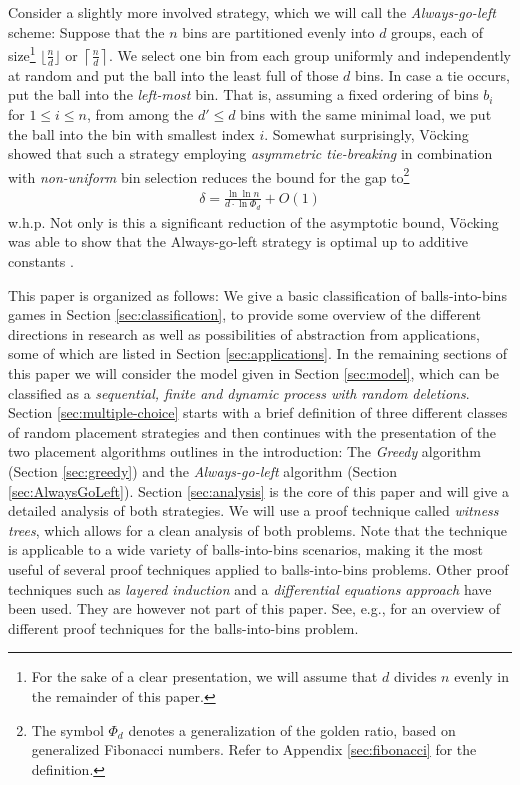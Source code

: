 \documentclass[a4paper,12pt]{article}
\begin{document}
Consider a slightly more involved strategy, which we will call the \emph{Always-go-left} scheme: Suppose that the $n$ bins are partitioned evenly into $d$ groups, each of size\footnote{For the sake of a clear presentation, we will assume that $d$ divides $n$ evenly in the remainder of this paper.} $\lfloor \frac{n}{d}\rfloor$ or $\left\lceil\frac{n}{d}\right\rceil$. We select one bin from each group uniformly and independently at random and put the ball into the least full of those $d$ bins. In case a tie occurs, put the ball into the \emph{left-most} bin. That is, assuming a fixed ordering of bins $b_i$ for $1 \leq i \leq n$, from among the $d' \leq d$ bins with the same minimal load, we put the ball into the bin with smallest index $i$. Somewhat surprisingly, V\"ocking \cite{VOC03} showed that such a strategy employing \emph{asymmetric tie-breaking} in combination with \emph{non-uniform} bin selection reduces the bound for the gap to\footnote{The symbol $\Phi_d$ denotes a generalization of the golden ratio, based on generalized Fibonacci numbers. Refer to Appendix \ref{sec:fibonacci} for the definition.}
\begin{align*}
\delta = \frac{\ln\ln n}{d \cdot \ln \Phi_d} + O(1)
\end{align*}
w.h.p. Not only is this a significant reduction of the asymptotic bound, V\"ocking was able to show that the Always-go-left strategy is optimal up to additive constants \cite{VOC03}.

This paper is organized as follows: We give a basic classification of balls-into-bins games in Section \ref{sec:classification}, to provide some overview of the different directions in research as well as possibilities of abstraction from applications, some of which are listed in Section \ref{sec:applications}. In the remaining sections of this paper we will consider the model given in Section \ref{sec:model}, which can be classified as a \emph{sequential, finite and dynamic process with random deletions}. Section \ref{sec:multiple-choice} starts with a brief definition of three different classes of random placement strategies and then continues with the presentation of the two placement algorithms outlines in the introduction: The  \emph{Greedy} algorithm (Section \ref{sec:greedy}) and the \emph{Always-go-left} algorithm (Section \ref{sec:AlwaysGoLeft}). Section \ref{sec:analysis} is the core of this paper and will give a detailed analysis of both strategies. We will use a proof technique called \emph{witness trees}, which allows for a clean analysis of both problems. Note that the technique is applicable to a wide variety of balls-into-bins scenarios, making it the most useful of several proof techniques applied to balls-into-bins problems. Other proof techniques such as \emph{layered induction} and a \emph{differential equations approach} have been used. They are however not part of this paper. See, e.g., \cite{MRS01} for an overview of different proof techniques for the balls-into-bins problem.
\end{document}
